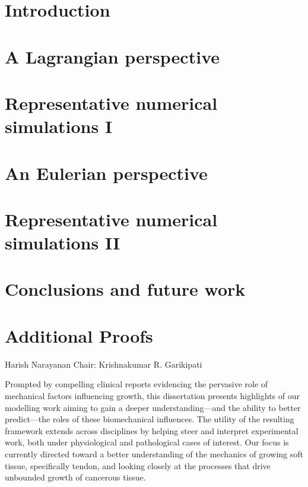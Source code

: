 \documentclass[leqno,final]{report}
\begin{document}
\tableofcontents
\listoffigures
\listoftables
\listofappendices

\startthechapters 

\chapter{Introduction}
\label{introduction}

\chapter{A Lagrangian perspective}
\label{lagrangian-perspective} 

\chapter{Representative numerical simulations I}
\label{numerical-simulations-1}

\chapter{An Eulerian perspective}
\label{eulerian-perspective}

\chapter{Representative numerical simulations II}
\label{numerical-simulations-2}

\chapter{Conclusions and future work}
\label{conclusions}



\startappendices
\chapter{Additional Proofs}
\label{additional-proofs}





 {Harish Narayanan} {Chair: Krishnakumar
  R. Garikipati}

Prompted by compelling clinical reports evidencing the pervasive role
of mechanical factors influencing growth, this dissertation presents
highlights of our modelling work aiming to gain a deeper
understanding---and the ability to better predict---the roles of these
biomechanical influences. The utility of the resulting framework
extends across disciplines by helping steer and interpret experimental
work, both under physiological and pathological cases of interest. Our
focus is currently directed toward a better understanding of the
mechanics of growing soft tissue, specifically tendon, and looking
closely at the processes that drive unbounded growth of cancerous
tissue.
\end{document}
